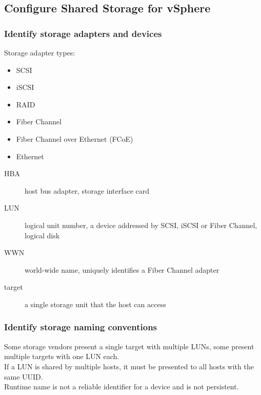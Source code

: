 \subsection{Configure Shared Storage for vSphere}

\subsubsection{Identify storage adapters and devices}

Storage adapter types:

\begin{itemize}
\item SCSI
\item iSCSI
\item RAID
\item Fiber Channel
\item Fiber Channel over Ethernet (FCoE)
\item Ethernet
\end{itemize}

\begin{description}

  \item[HBA] host bus adapter, storage interface card

  \item [LUN] logical unit number, a device addressed by SCSI, iSCSI or Fiber
    Channel, logical disk

  \item[WWN] world-wide name, uniquely identifies a Fiber Channel adapter

  \item[target] a single storage unit that the host can access

\end{description}

\subsubsection{Identify storage naming conventions}

Some storage vendors present a single target with multiple LUNs, some present
multiple targets with one LUN each.\\

If a LUN is shared by multiple hosts, it must be presented to all hosts with
the same UUID.\\

Runtime name is not a reliable identifier for a device and is not persistent.

